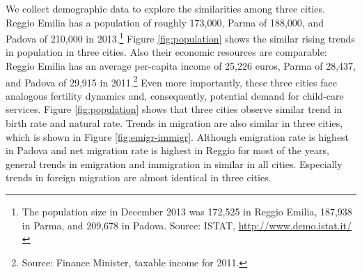 We collect demographic data to explore the similarities among three cities. Reggio Emilia has a population of roughly 173,000, Parma of 188,000, and Padova of 210,000 in 2013.\footnote{The population size in December 2013 was 172,525 in Reggio Emilia, 187,938 in Parma, and 209,678 in Padova. Source: ISTAT, \url{http://www.demo.istat.it/}} Figure \ref{fig:population} shows the similar rising trends in population in three cities. Also their economic resources are comparable: Reggio Emilia has an average per-capita income of 25,226 euros, Parma of 28,437, and Padova of 29,915 in 2011.\footnote{Source: Finance Minister, taxable income for 2011.} 
Even more importantly, these three cities face analogous fertility dynamics and, consequently, potential demand for child-care services. Figure \ref{fig:population} shows that three cities observe similar trend in birth rate and natural rate. Trends in migration are also similar in three cities, which is shown in Figure \ref{fig:emigr-immigr}. Although emigration rate is highest in Padova and net migration rate is highest in Reggio for most of the years, general trends in emigration and immigration in similar in all cities. Especially trends in foreign migration are almost identical in three cities.    

 